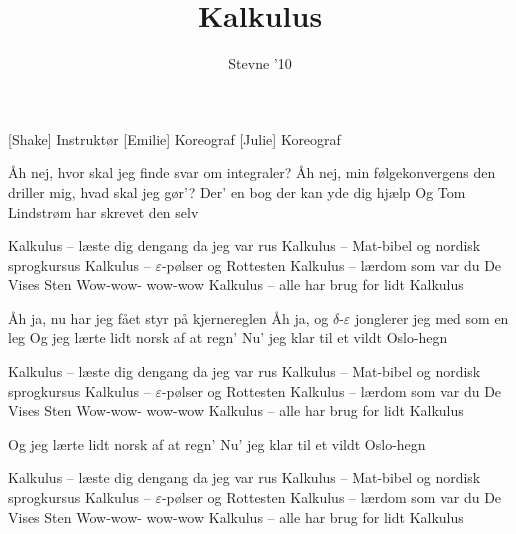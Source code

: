 \documentclass[a4paper,11pt]{article}
\title{Kalkulus}
\author{Stevne '10}
\begin{document}
\maketitle

\begin{roles}
[Shake] Instruktør
[Emilie] Koreograf
[Julie] Koreograf
\end{roles}

\begin{song}
 Åh nej, hvor skal jeg finde svar om integraler?
Åh nej, min følgekonvergens den driller mig, hvad skal jeg gør’?
Der’ en bog der kan yde dig hjælp
Og Tom Lindstrøm har skrevet den selv

 Kalkulus – læste dig dengang da jeg var rus
Kalkulus – Mat-bibel og nordisk sprogkursus
Kalkulus – $\varepsilon$-pølser og Rottesten
Kalkulus – lærdom som var du De Vises Sten
Wow-wow- wow-wow
Kalkulus – alle har brug for lidt Kalkulus

 Åh ja, nu har jeg fået styr på kjernereglen
Åh ja, og $\delta$-$\varepsilon$ jonglerer jeg med som en leg
Og jeg lærte lidt norsk af at regn’
Nu’ jeg klar til et vildt Oslo-hegn

 Kalkulus – læste dig dengang da jeg var rus
Kalkulus – Mat-bibel og nordisk sprogkursus
Kalkulus – $\varepsilon$-pølser og Rottesten
Kalkulus – lærdom som var du De Vises Sten
Wow-wow- wow-wow
Kalkulus – alle har brug for lidt Kalkulus

 Og jeg lærte lidt norsk af at regn’
Nu’ jeg klar til et vildt Oslo-hegn

 Kalkulus – læste dig dengang da jeg var rus
Kalkulus – Mat-bibel og nordisk sprogkursus
Kalkulus – $\varepsilon$-pølser og Rottesten
Kalkulus – lærdom som var du De Vises Sten
Wow-wow- wow-wow
Kalkulus – alle har brug for lidt Kalkulus



\end{song}
\end{document}
